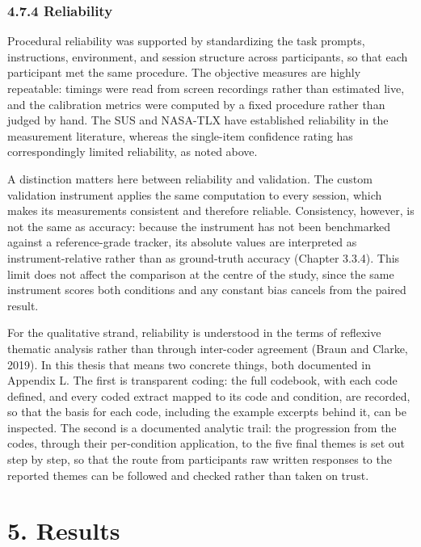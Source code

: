 \documentclass[
]{article}
\begin{document}
\hypertarget{reliability}{%
\subsubsection{4.7.4 Reliability}\label{reliability}}

Procedural reliability was supported by standardizing the task prompts, instructions, environment, and session structure across participants, so that each participant met the same procedure. The objective measures are highly repeatable: timings were read from screen recordings rather than estimated live, and the calibration metrics were computed by a fixed procedure rather than judged by hand. The SUS and NASA-TLX have established reliability in the measurement literature, whereas the single-item confidence rating has correspondingly limited reliability, as noted above.

A distinction matters here between reliability and validation. The custom validation instrument applies the same computation to every session, which makes its measurements consistent and therefore reliable. Consistency, however, is not the same as accuracy: because the instrument has not been benchmarked against a reference-grade tracker, its absolute values are interpreted as instrument-relative rather than as ground-truth accuracy (Chapter 3.3.4). This limit does not affect the comparison at the centre of the study, since the same instrument scores both conditions and any constant bias cancels from the paired result.

For the qualitative strand, reliability is understood in the terms of reflexive thematic analysis rather than through inter-coder agreement (Braun and Clarke, 2019). In this thesis that means two concrete things, both documented in Appendix L. The first is transparent coding: the full codebook, with each code defined, and every coded extract mapped to its code and condition, are recorded, so that the basis for each code, including the example excerpts behind it, can be inspected. The second is a documented analytic trail: the progression from the codes, through their per-condition application, to the five final themes is set out step by step, so that the route from participants\textquotesingle{} raw written responses to the reported themes can be followed and checked rather than taken on trust.


\clearpage
\hypertarget{results}{%
\section{\texorpdfstring{5. Results }{5. Results }}\label{results}}
\end{document}
